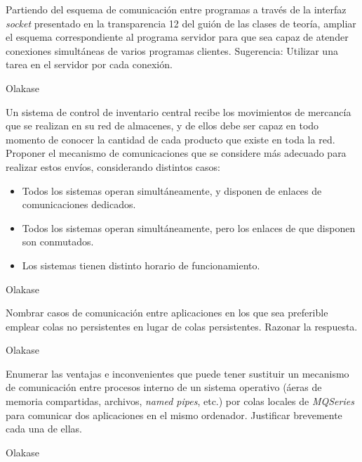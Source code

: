   \begin{problem}[6]
  Partiendo del esquema de comunicación entre programas a través de la
interfaz \textit{socket} presentado en la transparencia 12 del guión de las
clases de teoría, ampliar el esquema correspondiente al programa servidor para
que sea capaz de atender conexiones simultáneas de varios programas clientes.
Sugerencia: Utilizar una tarea en el servidor por cada conexión.
  \solution

  Olakase

  \end{problem}

  \begin{problem}[7]
  Un sistema de control de inventario central recibe los movimientos de
mercancía que se realizan en su red de almacenes, y de ellos debe ser capaz en
todo momento de conocer la cantidad de cada producto que existe en toda la red.
Proponer el mecanismo de comunicaciones que se considere más adecuado para
realizar estos envíos, considerando distintos casos:
  \begin{itemize}
    \item Todos los sistemas operan simultáneamente, y disponen de enlaces de
comunicaciones dedicados.
    \item Todos los sistemas operan simultáneamente, pero los enlaces de que disponen
son conmutados.
    \item Los sistemas tienen distinto horario de funcionamiento.
   \end{itemize}
    \solution

    Olakase

    \end{problem}

  \begin{problem}[8]
  Nombrar casos de comunicación entre aplicaciones en los que sea
preferible emplear colas no persistentes en lugar de colas persistentes.
Razonar la respuesta.
  \solution

  Olakase

  \end{problem}

  \begin{problem}[9]
  Enumerar las ventajas e inconvenientes que puede tener sustituir un mecanismo
  de comunicación entre procesos interno de un sistema operativo (áeras
  de memoria compartidas, archivos, \textit{named pipes}, etc.) por colas locales
de \textit{MQSeries} para comunicar dos aplicaciones en el mismo ordenador.
Justificar brevemente cada una de ellas.
  \solution

  Olakase

  \end{problem}

